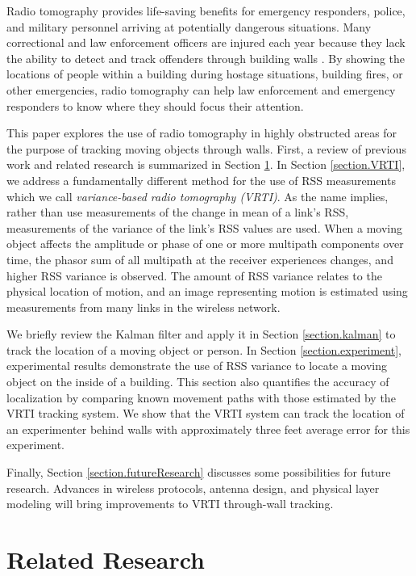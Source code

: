 \documentclass[journal]{IEEEtran}
\begin{document}
Radio tomography provides life-saving benefits for emergency responders, police, and military personnel arriving at potentially dangerous situations. Many correctional and law enforcement officers are injured each year because they lack the ability to detect and track offenders through building walls \cite{Hunt01}.  By showing the locations of people within a building during hostage situations, building fires, or other emergencies, radio tomography can help law enforcement and emergency responders to know where they should focus their attention.

This paper explores the use of radio tomography in highly obstructed areas for the purpose of tracking moving objects through walls. First, a review of previous work and related research is summarized in Section \ref{section.related}. In Section \ref{section.VRTI}, we address a fundamentally different method for the use of RSS measurements which we call \textit{variance-based radio tomography (VRTI)}.  As the name implies, rather than use measurements of the change in mean of a link's RSS, measurements of the variance of the link's RSS values are used.  When a moving object affects the amplitude or phase of one or more multipath components over time, the phasor sum of all multipath at the receiver experiences changes, and higher RSS variance is observed. The amount of RSS variance relates to the physical location of motion, and an image representing motion is estimated using measurements from many links in the wireless network.

We briefly review the Kalman filter and apply it in Section \ref{section.kalman} to track the location of a moving object or person. In Section \ref{section.experiment}, experimental results demonstrate the use of RSS variance to locate a moving object on the inside of a building. This section also quantifies the accuracy of localization by comparing known movement paths with those estimated by the VRTI tracking system. We show that the VRTI system can track the location of an experimenter behind walls with approximately three feet average error for this experiment.

Finally, Section \ref{section.futureResearch} discusses some possibilities for future research. Advances in wireless protocols, antenna design, and physical layer modeling will bring improvements to VRTI through-wall tracking.

\section{Related Research}\label{section.related}
\end{document}
